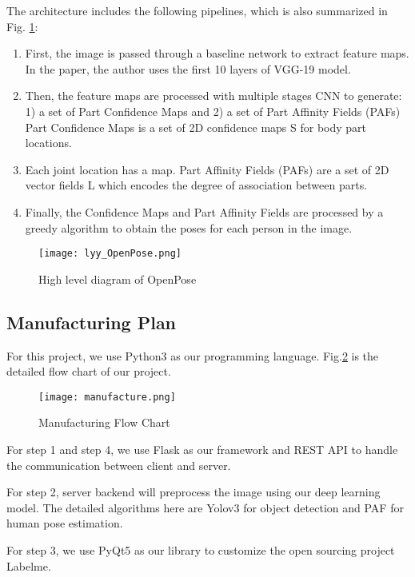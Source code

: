 The architecture includes the following pipelines, which is also summarized in Fig. \ref{fig:openpose_arch}:

\begin{enumerate}
    \item First, the image is passed through a baseline network to extract feature maps. In the paper, the author uses the first 10 layers of VGG-19 model.
    \item Then, the feature maps are processed with multiple stages CNN to generate: 1) a set of Part Confidence Maps and 2) a set of Part Affinity Fields (PAFs) Part Confidence Maps is a set of 2D confidence maps S for body part locations. 
    \item Each joint location has a map. Part Affinity Fields (PAFs) are a set of 2D vector fields L which encodes the degree of association between parts.
    \item Finally, the Confidence Maps and Part Affinity Fields are processed by a greedy algorithm to obtain the poses for each person in the image.

\end{enumerate}

    \begin{figure}[h!]
        \centering \texttt{[image: lyy\_OpenPose.png]}
        \caption{High level diagram of OpenPose}
        \label{fig:openpose_arch}
    \end{figure}


\subsection{Manufacturing Plan}
For this project, we use Python3 as our programming language. Fig.\ref{fig:Manu_FlowChart} is the detailed flow chart of our project.
\begin{figure}[h!]
  \centering \texttt{[image: manufacture.png]}
  \caption{Manufacturing Flow Chart}
  \label{fig:Manu_FlowChart}
\end{figure}

For step 1 and step 4, we use Flask as our framework and REST API to handle the communication between client and server. 

For step 2, server backend will preprocess the image using our deep learning model. The detailed algorithms here are Yolov3 for object detection and PAF for human pose estimation.  


For step 3, we use PyQt5 as our library to customize the open sourcing project Labelme. 

